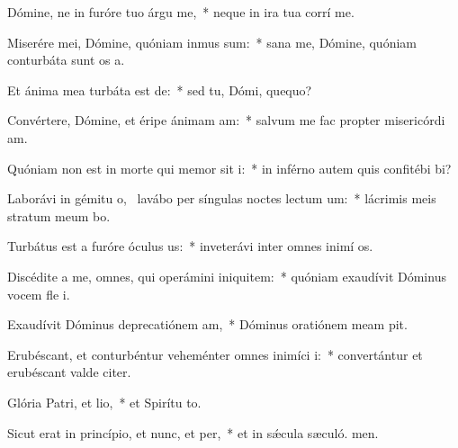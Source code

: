 \item Dómine, ne in furóre tuo árgu me,~* neque in ira tua corrí me.
\item Miserére mei, Dómine, quóniam inmus sum:~* sana me, Dómine, quóniam conturbáta sunt os a.
\item Et ánima mea turbáta est de:~* sed tu, Dómi, quequo?
\item Convértere, Dómine, et éripe ánimam am:~* salvum me fac propter misericórdi am.
\item Quóniam non est in morte qui memor sit i:~* in inférno autem quis confitébi bi?
\item Laborávi in gémitu o,~\pscross{} lavábo per síngulas noctes lectum um:~* lácrimis meis stratum meum bo.
\item Turbátus est a furóre óculus us:~* inveterávi inter omnes inimí os.
\item Discédite a me, omnes, qui operámini iniquitem:~* quóniam exaudívit Dóminus vocem fle i.
\item Exaudívit Dóminus deprecatiónem am,~* Dóminus oratiónem meam pit.
\item Erubéscant, et conturbéntur veheménter omnes inimíci i:~* convertántur et erubéscant valde citer.
\item Glória Patri, et lio,~* et Spirítu to.
\item Sicut erat in princípio, et nunc, et per,~* et in sǽcula sæculó. men.
